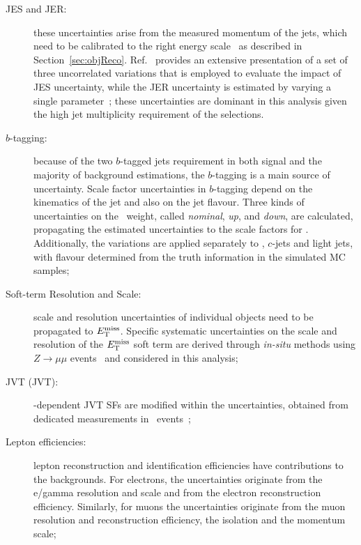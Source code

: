 			\begin{description}
				\item [\ac{JES} and \ac{JER}:] these uncertainties arise from the measured momentum of the jets, which need to be calibrated to the right energy scale~\cite{ATLAS13TeVJES} as described in Section~\ref{sec:objReco}. Ref.~\cite{ATLAS13TeVJES} provides an extensive presentation of a set of three uncorrelated variations that is employed to evaluate the impact of \ac{JES} uncertainty, while the \ac{JER} uncertainty is estimated by varying a single parameter~\cite{ATLAS2010JER}; these uncertainties are dominant in this analysis given the high jet multiplicity requirement of the selections.

				\item [$b$-tagging:] because of the two $b$-tagged jets requirement in both signal and the majority of background estimations, the $b$-tagging is a main source of uncertainty. Scale factor uncertainties in $b$-tagging depend on the kinematics of the jet and also on the jet flavour. Three kinds of uncertainties on the \bj\ weight, called \emph{nominal}, \emph{up}, and \emph{down}, are calculated, propagating the estimated uncertainties to the scale factors for \bjs. Additionally, the variations are applied separately to \bjs, $c$-jets and light jets, with flavour determined from the truth information in the simulated \ac{MC} samples; 

				\item[\boldmath \met Soft-term Resolution and Scale:] scale and resolution uncertainties of individual objects need to be propagated to $E_{\mathrm{T}}^{\mathrm{miss}}$. Specific systematic uncertainties on the scale and resolution of the $E_{\mathrm{T}}^{\mathrm{miss}}$ soft term are derived through \emph{in-situ} methods using $Z \rightarrow \mu\mu$ events~\cite{ATLASMet2015} and considered in this analysis;

				\item [\acl{JVT} (JVT):] \pt-dependent \ac{JVT} \acp{SF} are modified within the uncertainties, obtained from dedicated measurements in \Zmm\ events~\cite{ATLAS-CONF-2014-018};

				\item [Lepton efficiencies:] lepton reconstruction and identification efficiencies have contributions to the backgrounds. For electrons, the uncertainties originate from the e/gamma resolution and scale and from the electron reconstruction efficiency. Similarly, for muons the uncertainties originate from the muon resolution and reconstruction efficiency, the isolation and the momentum scale;


\end{description}
